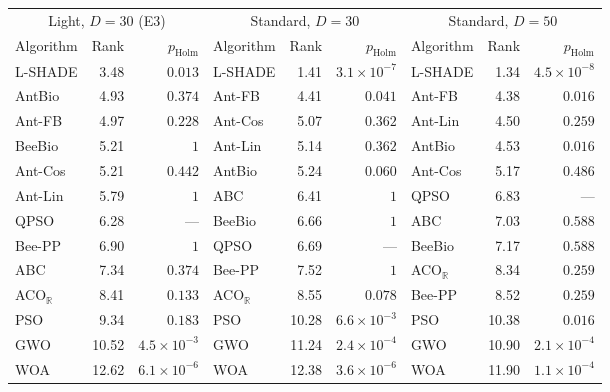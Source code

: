 \begin{tabular}{lrrlrrlrr}
\toprule
\multicolumn{3}{c}{Light, $D=30$ (E3)} & \multicolumn{3}{c}{Standard, $D=30$} & \multicolumn{3}{c}{Standard, $D=50$} \\
Algorithm & Rank & $p_{\mathrm{Holm}}$ & Algorithm & Rank & $p_{\mathrm{Holm}}$ & Algorithm & Rank & $p_{\mathrm{Holm}}$ \\
\midrule
L-SHADE & 3.48 & $0.013$ & L-SHADE & 1.41 & $3.1\times10^{-7}$ & L-SHADE & 1.34 & $4.5\times10^{-8}$ \\
AntBio & 4.93 & $0.374$ & Ant-FB & 4.41 & $0.041$ & Ant-FB & 4.38 & $0.016$ \\
Ant-FB & 4.97 & $0.228$ & Ant-Cos & 5.07 & $0.362$ & Ant-Lin & 4.50 & $0.259$ \\
BeeBio & 5.21 & $1$ & Ant-Lin & 5.14 & $0.362$ & AntBio & 4.53 & $0.016$ \\
Ant-Cos & 5.21 & $0.442$ & AntBio & 5.24 & $0.060$ & Ant-Cos & 5.17 & $0.486$ \\
Ant-Lin & 5.79 & $1$ & ABC & 6.41 & $1$ & QPSO & 6.83 & --- \\
QPSO & 6.28 & --- & BeeBio & 6.66 & $1$ & ABC & 7.03 & $0.588$ \\
Bee-PP & 6.90 & $1$ & QPSO & 6.69 & --- & BeeBio & 7.17 & $0.588$ \\
ABC & 7.34 & $0.374$ & Bee-PP & 7.52 & $1$ & ACO$_\mathbb{R}$ & 8.34 & $0.259$ \\
ACO$_\mathbb{R}$ & 8.41 & $0.133$ & ACO$_\mathbb{R}$ & 8.55 & $0.078$ & Bee-PP & 8.52 & $0.259$ \\
PSO & 9.34 & $0.183$ & PSO & 10.28 & $6.6\times10^{-3}$ & PSO & 10.38 & $0.016$ \\
GWO & 10.52 & $4.5\times10^{-3}$ & GWO & 11.24 & $2.4\times10^{-4}$ & GWO & 10.90 & $2.1\times10^{-4}$ \\
WOA & 12.62 & $6.1\times10^{-6}$ & WOA & 12.38 & $3.6\times10^{-6}$ & WOA & 11.90 & $1.1\times10^{-4}$ \\
\bottomrule
\end{tabular}
